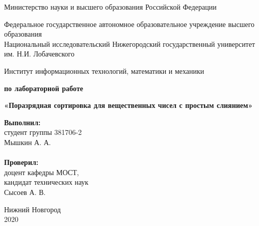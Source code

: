 \documentclass{report}
\begin{document}
\begin{titlepage}

\begin{center}
Министерство науки и высшего образования Российской Федерации
\end{center}

\begin{center}
Федеральное государственное автономное образовательное учреждение высшего образования \\
Национальный исследовательский Нижегородский государственный университет им. Н.И. Лобачевского
\end{center}

\begin{center}
Институт информационных технологий, математики и механики
\end{center}

\vspace{4em}

\begin{center}
\textbf{ по лабораторной работе} \\
\end{center}
\begin{center}
\textbf{\Large«Поразрядная сортировка для вещественных чисел с простым слиянием»} \\
\end{center}

\vspace{4em}

\newbox{\lbox}
\newlength{\maxl}
\setlength{\maxl}{\wd\lbox}
\hfill\parbox{7cm}{
\hspace*{5cm}\hspace*{-5cm}\textbf{Выполнил:} \\ студент группы 381706-2 \\ Мышкин А. А.\\
\\
\hspace*{5cm}\hspace*{-5cm}\textbf{Проверил:}\\ доцент кафедры МОСТ, \\ кандидат технических наук \\ Сысоев А. В.
}

\vspace{\fill}

\begin{center} Нижний Новгород \\ 2020 \end{center}

\end{titlepage}
\end{document}
